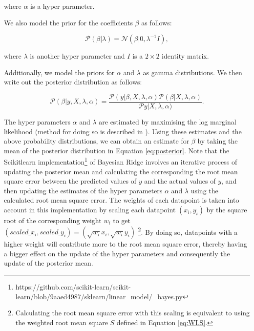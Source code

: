 \documentclass[11pt]{article}
\begin{document}
where $\alpha$ is a hyper parameter.

We also model the prior for the coefficients $\beta$ as follows:

\begin{equation}
	\label{eq:prior}
    \mathcal{P}(\beta | \lambda) = \mathcal{N}(\beta | 0, \lambda^{-1}I),
\end{equation}

where $\lambda$ is another hyper parameter and $I$ is a $2\times2$ identity matrix.

Additionally, we model the priors for $\alpha$ and $\lambda$ as gamma distributions. We then write out the posterior distribution as follows:

\begin{equation}
	\label{eq:posterior}
    \mathcal{P}(\beta | y,X,\lambda,\alpha) = \frac{\mathcal{P}(y | \beta, X, \lambda, \alpha)\mathcal{P}(\beta | X, \lambda, \alpha)}{\mathcal{P}y | X, \lambda, \alpha)}.
\end{equation}

The hyper parameters $\alpha$ and $\lambda$ are estimated by maximising the log marginal likelihood (method for doing so is described in \cite{tipping2001sparse}). Using these estimates and the above probability distributions, we can obtain an estimate for $\beta$ by taking the mean of the posterior distribution in Equation \ref{eq:posterior}. Note that the Scikit\-learn implementation\footnote{https://github.com/scikit-learn/scikit-learn/blob/9aaed4987/sklearn/linear\_model/\_bayes.py} of Bayesian Ridge involves an iterative process of updating the posterior mean and calculating the corresponding the root mean square error between the predicted values of $y$ and the actual values of $y$, and then updating the estimates of the hyper parameters $\alpha$ and $\lambda$ using the calculated root mean square error. The weights of each datapoint is taken into account in this implementation by scaling each datapoint $(x_{i}, y_{i})$ by the square root of the corresponding weight $w_{i}$ to get $(scaled\_x_{i}, scaled\_y_{i}) = (\sqrt{w_{i}} x_{i}, \sqrt{w_{i}} y_{i})$ \footnote{Calculating the root mean square error with this scaling is equivalent to using the weighted root mean square $S$ defined in Equation \ref{eq:WLS}.}. By doing so, datapoints with a higher weight will contribute more to the root mean square error, thereby having a bigger effect on the update of the hyper parameters and consequently the update of the posterior mean.

\end{document}
